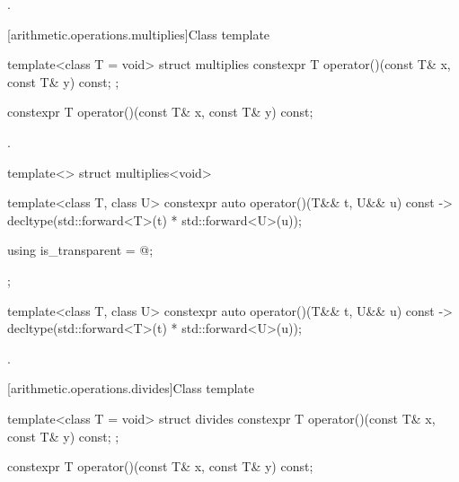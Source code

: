 \begin{itemdescr}
\pnum
\returns
{}.
\end{itemdescr}

[arithmetic.operations.multiplies]{Class template }

%
\begin{itemdecl}
template<class T = void> struct multiplies {
  constexpr T operator()(const T& x, const T& y) const;
};
\end{itemdecl}

%
\begin{itemdecl}
constexpr T operator()(const T& x, const T& y) const;
\end{itemdecl}

\begin{itemdescr}
\pnum
\returns
{}.
\end{itemdescr}

%
\begin{itemdecl}
template<> struct multiplies<void> {
  template<class T, class U> constexpr auto operator()(T&& t, U&& u) const
    -> decltype(std::forward<T>(t) * std::forward<U>(u));

  using is_transparent = @\unspec@;
};
\end{itemdecl}

%
\begin{itemdecl}
template<class T, class U> constexpr auto operator()(T&& t, U&& u) const
  -> decltype(std::forward<T>(t) * std::forward<U>(u));
\end{itemdecl}

\begin{itemdescr}
\pnum
\returns
{}.
\end{itemdescr}

[arithmetic.operations.divides]{Class template }

%
\begin{itemdecl}
template<class T = void> struct divides {
  constexpr T operator()(const T& x, const T& y) const;
};
\end{itemdecl}

%
\begin{itemdecl}
constexpr T operator()(const T& x, const T& y) const;
\end{itemdecl}

